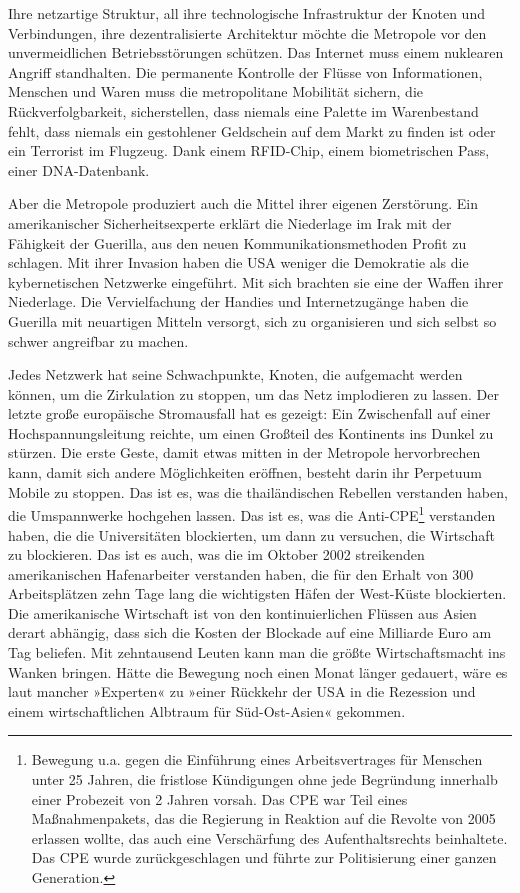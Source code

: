 Ihre netzartige Struktur, all ihre technologische Infrastruktur der
Knoten und Verbindungen, ihre dezentralisierte Architektur möchte
die Metropole vor den unvermeidlichen Betriebsstörungen schützen.
Das Internet muss einem nuklearen Angriff standhalten. Die
permanente Kontrolle der Flüsse von Informationen, Menschen und
Waren muss die metropolitane Mobilität sichern, die
Rückverfolgbarkeit, sicherstellen, dass niemals eine Palette im
Warenbestand fehlt, dass niemals ein gestohlener Geldschein auf dem
Markt zu finden ist oder ein Terrorist im Flugzeug. Dank einem
RFID-Chip, einem biometrischen Pass, einer DNA-Datenbank.

Aber die Metropole produziert auch die Mittel ihrer eigenen
Zerstörung. Ein amerikanischer Sicherheitsexperte erklärt die
Niederlage im Irak mit der Fähigkeit der Guerilla, aus den neuen
Kommunikationsmethoden Profit zu schlagen. Mit ihrer Invasion haben
die USA weniger die Demokratie als die kybernetischen Netzwerke
eingeführt. Mit sich brachten sie eine der Waffen ihrer Niederlage.
Die Vervielfachung der Handies und Internetzugänge haben die
Guerilla mit neuartigen Mitteln versorgt, sich zu organisieren und
sich selbst so schwer angreifbar zu machen.

Jedes Netzwerk hat seine Schwachpunkte, Knoten, die aufgemacht
werden können, um die Zirkulation zu stoppen, um das Netz
implodieren zu lassen. Der letzte große europäische Stromausfall
hat es gezeigt: Ein Zwischenfall auf einer Hochspannungsleitung
reichte, um einen Großteil des Kontinents ins Dunkel zu stürzen.
Die erste Geste, damit etwas mitten in der Metropole hervorbrechen
kann, damit sich andere Möglichkeiten eröffnen, besteht darin ihr
Perpetuum Mobile zu stoppen. Das ist es, was die thailändischen
Rebellen verstanden haben, die Umspannwerke hochgehen lassen. Das
ist es, was die Anti-CPE\footnote{
Bewegung u.a. gegen die Einführung eines Arbeitsvertrages für
Menschen unter 25 Jahren, die fristlose Kündigungen ohne jede
Begründung innerhalb einer Probezeit von 2 Jahren vorsah. Das CPE
war Teil eines Maßnahmenpakets, das die Regierung in Reaktion auf
die Revolte von 2005 erlassen wollte, das auch eine Verschärfung
des Aufenthaltsrechts beinhaltete. Das CPE wurde zurückgeschlagen
und führte zur Politisierung einer ganzen Generation.
}
verstanden haben, die die Universitäten
blockierten, um dann zu versuchen, die Wirtschaft zu blockieren.
Das ist es auch, was die im Oktober 2002 streikenden amerikanischen
Hafenarbeiter verstanden haben, die für den Erhalt von 300
Arbeitsplätzen zehn Tage lang die wichtigsten Häfen der West-Küste
blockierten. Die amerikanische Wirtschaft ist von den
kontinuierlichen Flüssen aus Asien derart abhängig, dass sich die
Kosten der Blockade auf eine Milliarde Euro am Tag beliefen. Mit
zehntausend Leuten kann man die größte Wirtschaftsmacht ins Wanken
bringen. Hätte die Bewegung noch einen Monat länger gedauert, wäre
es laut mancher »Experten« zu »einer Rückkehr der USA in die
Rezession und einem wirtschaftlichen Albtraum für Süd-Ost-Asien«
gekommen.

